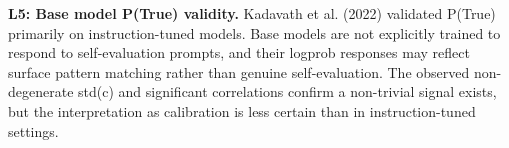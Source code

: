 \textbf{L5: Base model P(True) validity.} Kadavath et al. (2022) validated P(True) primarily on instruction-tuned models. Base models are not explicitly trained to respond to self-evaluation prompts, and their logprob responses may reflect surface pattern matching rather than genuine self-evaluation. The observed non-degenerate std(c) and significant correlations confirm a non-trivial signal exists, but the interpretation as calibration is less certain than in instruction-tuned settings.
